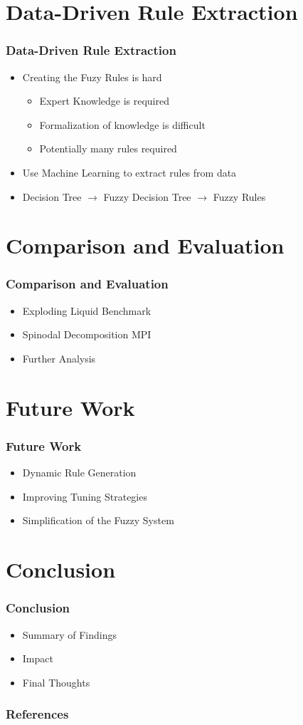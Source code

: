 \documentclass[
	10pt,
	t		%
]{beamer}
\begin{document}
\section{Data-Driven Rule Extraction}
\begin{frame}
	\frametitle{Data-Driven Rule Extraction}
	\begin{itemize}
		\item Creating the Fuzy Rules is hard
		      \begin{itemize}
			      \item Expert Knowledge is required
			      \item Formalization of knowledge is difficult
			      \item Potentially many rules required
		      \end{itemize}
		\item Use Machine Learning to extract rules from data
		\item Decision Tree $\rightarrow$ Fuzzy Decision Tree $\rightarrow$ Fuzzy Rules \cite{CROCKETT20062809}
	\end{itemize}
\end{frame}

\section{Comparison and Evaluation}
\begin{frame}
	\frametitle{Comparison and Evaluation}
	\begin{itemize}
		\item Exploding Liquid Benchmark
		\item Spinodal Decomposition MPI
		\item Further Analysis
	\end{itemize}
\end{frame}

\section{Future Work}
\begin{frame}
	\frametitle{Future Work}
	\begin{itemize}
		\item Dynamic Rule Generation
		\item Improving Tuning Strategies
		\item Simplification of the Fuzzy System
	\end{itemize}
\end{frame}

\section{Conclusion}
\begin{frame}
	\frametitle{Conclusion}
	\begin{itemize}
		\item Summary of Findings
		\item Impact
		\item Final Thoughts
	\end{itemize}
\end{frame}

\begin{frame}[allowframebreaks]
	\frametitle{References}
	
	
\end{frame}
\end{document}
